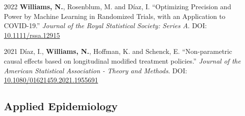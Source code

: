 \documentclass[12pt,letterpaper]{report}
\begin{document}
\begin{tablist}
        \item[2022] \tab \textbf{Williams, N.}, Rosenblum, M. and Díaz, I. \enquote {Optimizing Precision and Power by Machine Learning in Randomized Trials, with an Application to COVID-19.} \textit{Journal of the Royal Statistical Society: Series A}. DOI: \href{https://doi.org/10.1111/rssa.12915}{10.1111/rssa.12915}
    
       \item[2021] \tab Díaz, I., \textbf{Williams, N.}, Hoffman, K. and Schenck, E. \enquote{Non-parametric causal effects based on longitudinal modified treatment policies.} \textit{Journal of the American Statistical Association - Theory and Methods}. DOI: \href{https://doi.org/10.1080/01621459.2021.1955691}{10.1080/01621459.2021.1955691}
       
    \end{tablist}

    \subsection*{Applied Epidemiology}
\end{document}

